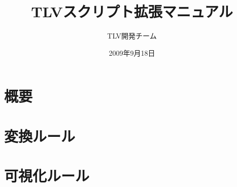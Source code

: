 \documentclass[a4paper,12pt]{jreport}
\begin{document}
\title{TLVスクリプト拡張マニュアル}
\date{2009年9月18日}
\author{TLV開発チーム}
\maketitle
\pagestyle{plain} 
\setcounter{page}{1}
\tableofcontents

\pagestyle{plain} 
\setcounter{page}{1}

\chapter{概要}


\chapter{変換ルール}


\chapter{可視化ルール}



\end{document}
